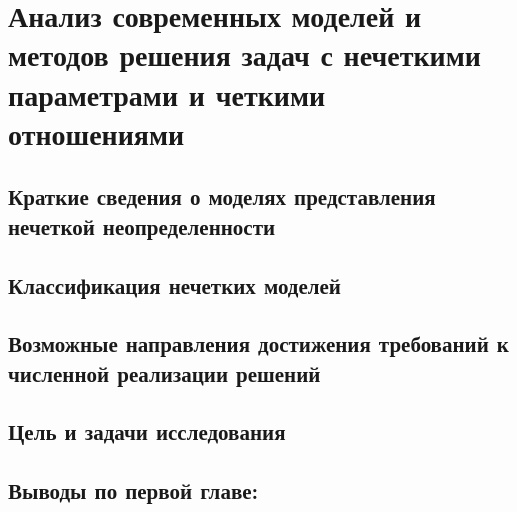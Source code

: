 \chapter{Анализ современных моделей и методов решения задач с нечеткими параметрами и четкими отношениями}
\label{chapter1}

\section{Краткие сведения о моделях представления нечеткой неопределенности}
\label{chapter1_1}


\section{Классификация нечетких моделей} 
\label{chapter1_2}


\section{Возможные направления достижения требований к численной реализации решений} 
\label{chapter1_3}


\section{Цель и задачи исследования} 
\label{chapter1_4}


\section*{Выводы по первой главе:}
\label{chapter1_5}
